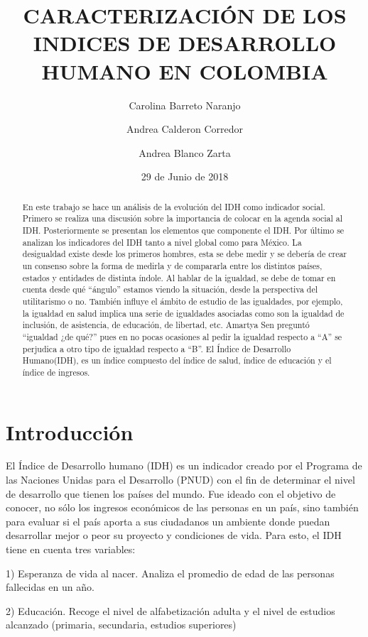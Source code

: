 \documentclass{article}
\title{CARACTERIZACIÓN DE LOS INDICES DE DESARROLLO HUMANO EN COLOMBIA}
\author[1]{\normalsize Carolina Barreto Naranjo}
\author[2]{\normalsize Andrea Calderon Corredor}
\author[3]{\normalsize Andrea Blanco Zarta}
\affil[1,2,3]{\small  Facultad de Ingeniería,Universidad de los Andes\\
\texttt{{c.barreto805,a.calderon,a.blanco}@uniandes.edu.co}}
\affil[1,2,3]{\small Herramientas Computacionales para la Investigacion\\}
\date{29 de Junio de 2018}
\begin{document}


\maketitle


\begin{abstract}
En este trabajo se hace un análisis de la evolución del IDH como indicador social. Primero se realiza una discusión sobre la importancia de colocar en la agenda social al IDH. Posteriormente se presentan los elementos que componente el IDH. Por último se analizan los indicadores del IDH tanto a nivel global como para México. La desigualdad existe desde los primeros hombres, esta se debe medir y se debería de crear un consenso sobre la forma de medirla y de compararla entre los distintos países, estados y entidades de distinta índole. Al hablar de la igualdad, se debe de tomar en cuenta desde qué “ángulo” estamos viendo la situación, desde la perspectiva del utilitarismo o no. También influye el ámbito de estudio de las igualdades, por ejemplo, la igualdad en salud implica una serie de igualdades asociadas como son la igualdad de inclusión, de asistencia, de educación, de libertad, etc. Amartya Sen preguntó “igualdad ¿de qué?” pues en no pocas ocasiones al pedir la igualdad respecto a “A” se perjudica a otro tipo de igualdad respecto a “B”. El Índice de Desarrollo Humano(IDH), es un índice compuesto del índice de salud, índice de educación y el índice de ingresos. 
\end{abstract}

\section*{Introducción}

El Índice de Desarrollo humano (IDH) es un indicador creado por el Programa de las Naciones Unidas para el Desarrollo (PNUD) con el fin de determinar el nivel de desarrollo que tienen los países del mundo.  Fue ideado con el objetivo de conocer, no sólo los ingresos económicos de las personas en un país, sino también para evaluar si el país aporta a sus ciudadanos un ambiente donde puedan desarrollar mejor o peor su proyecto y condiciones de vida.  Para esto, el IDH tiene en cuenta tres variables:

1) Esperanza de vida al nacer. Analiza el promedio de edad de las personas fallecidas en un año.

2) Educación. Recoge el nivel de alfabetización adulta y el nivel de estudios alcanzado (primaria, secundaria, estudios superiores)
\end{document}

